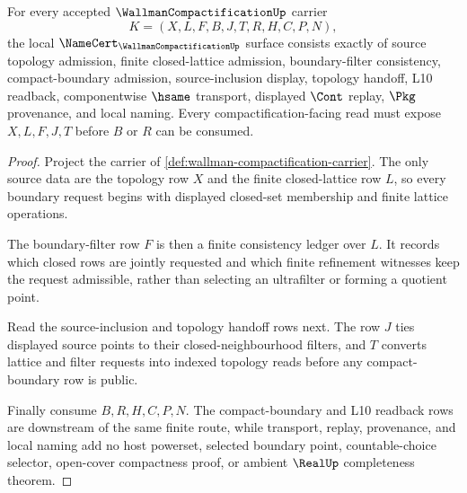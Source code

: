 \begin{theorem}
\label{thm:wallman-compactification-namecert-obligations}
For every accepted $\WallmanCompactificationUp$ carrier
$$
K=(X,L,F,B,J,T,R,H,C,P,N),
$$
the local $\NameCert_{\WallmanCompactificationUp}$ surface consists exactly of source topology admission, finite closed-lattice admission, boundary-filter consistency, compact-boundary admission, source-inclusion display, topology handoff, L10 readback, componentwise $\hsame$ transport, displayed $\Cont$ replay, $\Pkg$ provenance, and local naming. Every compactification-facing read must expose $X,L,F,J,T$ before $B$ or $R$ can be consumed.
\end{theorem}
\begin{proof}
Project the carrier of \autoref{def:wallman-compactification-carrier}. The only source data are the topology row $X$ and the finite closed-lattice row $L$, so every boundary request begins with displayed closed-set membership and finite lattice operations.

The boundary-filter row $F$ is then a finite consistency ledger over $L$. It records which closed rows are jointly requested and which finite refinement witnesses keep the request admissible, rather than selecting an ultrafilter or forming a quotient point.

Read the source-inclusion and topology handoff rows next. The row $J$ ties displayed source points to their closed-neighbourhood filters, and $T$ converts lattice and filter requests into indexed topology reads before any compact-boundary row is public.

Finally consume $B,R,H,C,P,N$. The compact-boundary and L10 readback rows are downstream of the same finite route, while transport, replay, provenance, and local naming add no host powerset, selected boundary point, countable-choice selector, open-cover compactness proof, or ambient $\RealUp$ completeness theorem.
\end{proof}

